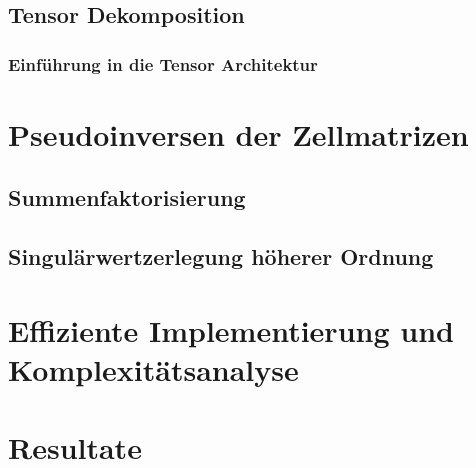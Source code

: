 \documentclass[12pt,a4paper]{scrartcl}
\numberwithin{equation}{section}
\begin{document}
\newpage
\subsection{Tensor Dekomposition}
\subsubsection{Einführung in die Tensor Architektur}




\newpage
\section{Pseudoinversen der Zellmatrizen}

\subsection{Summenfaktorisierung}



\subsection{Singulärwertzerlegung höherer Ordnung}



\newpage
\section{Effiziente Implementierung und Komplexitätsanalyse}





\newpage
\section{Resultate}






\newpage
{}




 



\end{document}
